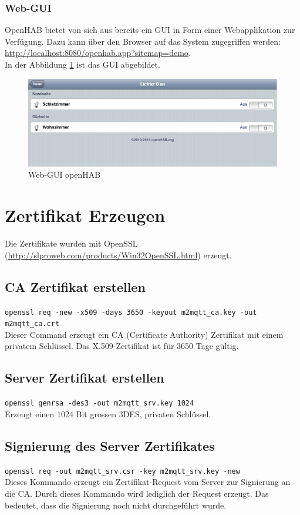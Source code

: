 \subsubsection*{Web-GUI}
OpenHAB bietet von sich aus bereits ein GUI in Form einer Webapplikation zur Verfügung. Dazu kann über den Browser auf das System zugegriffen werden: \url{http://localhost:8080/openhab.app?sitemap=demo}.
\\ In der Abbildung \ref{fig:guiOpenhab} ist das GUI abgebildet.

\begin{figure}[H]
	\centering
		\includegraphics[scale=0.4]{appendix/img/standardGui}
	\caption{Web-GUI openHAB}
	\label{fig:guiOpenhab}
\end{figure}

\pagebreak
\section*{Zertifikat Erzeugen}
Die Zertifikate wurden mit OpenSSL (\url{http://slproweb.com/products/Win32OpenSSL.html}) erzeugt.

\subsection*{CA Zertifikat erstellen}
\lstinline!openssl req -new -x509 -days 3650 -keyout m2mqtt_ca.key -out m2mqtt_ca.crt! \\
Dieser Command erzeugt ein CA (Certificate Authority) Zertifikat mit einem privatem Schlüssel. Das X.509-Zertifikat ist für 3650 Tage gültig.

\subsection*{Server Zertifikat erstellen}
\lstinline!openssl genrsa -des3 -out m2mqtt_srv.key 1024! \\
Erzeugt einen 1024 Bit grossen 3DES, privaten Schlüssel. 

\subsection*{Signierung des Server Zertifikates}
\lstinline!openssl req -out m2mqtt_srv.csr -key m2mqtt_srv.key -new! \\
Dieses Kommando erzeugt ein Zertifikat-Request vom Server zur Signierung an die CA. Durch dieses Kommando wird lediglich der Request erzeugt. Das bedeutet, dass die Signierung noch nicht durchgeführt wurde.

